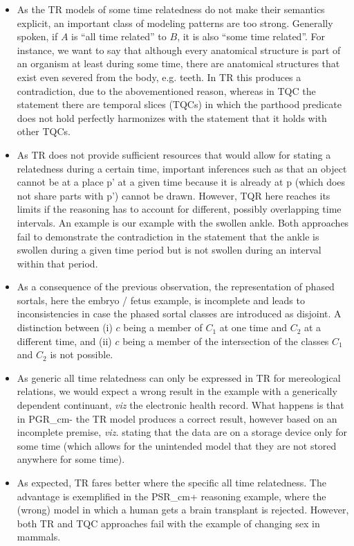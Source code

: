 \begin{itemize}
\item
As the TR models of some time relatedness do not make their semantics explicit, an important
class of modeling patterns are too strong. Generally spoken, if $A$ is ``all time related'' to $B$,
it is also ``some time related''. For instance, we want to say that although every anatomical structure 
is part of an organism at least during some time, there are anatomical structures that exist even severed 
from the body, e.g. teeth. In TR this produces a contradiction, due to the abovementioned reason, whereas 
in TQC the statement there are temporal slices (TQCs) in which the parthood predicate does not hold perfectly   
harmonizes with the statement that it holds with other TQCs.

\item
As TR does not provide sufficient resources that would allow for stating a relatedness during a 
certain time, important inferences such as that an object cannot be at a place p' at a given time 
because it is already at p (which does not share parts with p') cannot be drawn. However, TQR here
reaches its limits if the reasoning has to account for different, possibly overlapping time intervals. 
An example is our example with the swollen ankle. Both approaches fail to demonstrate the contradiction 
in the statement that the ankle is swollen during a given time period but is not swollen during an interval
within that period.  


\item
As a consequence of the previous observation, the representation of phased sortals, here 
the embryo / fetus example, is incomplete and leads to inconsistencies in case the phased sortal classes 
are introduced as disjoint. A distinction between (i) $c$ being a member of $C_1$ at one time and 
$C_2$ at a different time, and (ii) $c$ being a member of the intersection of the classes $C_1$ 
and $C_2$ is not possible.


\item
As generic all time relatedness can only be expressed in TR for mereological relations, we would 
expect a wrong result in the example with a generically dependent continuant, \emph{viz} 
the electronic health record. What happens is that in PGR\_cm- the TR model produces a correct
result, however based on an incomplete premise, \emph{viz.} stating that the data are on a storage 
device only for some time (which allows for the unintended model that they are not stored anywhere
for some time). 

\item
As expected, TR fares better where the specific all time relatedness. The advantage is exemplified
in the PSR\_cm+ reasoning example, where the (wrong) model in which a human gets a brain transplant
is rejected. However, both TR and TQC approaches fail with the example
of changing sex in mammals.
  
\end{itemize}
  
